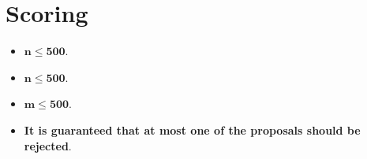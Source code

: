 \section*{Scoring}
\begin{itemize}
    \item $\mathbf{n} \mathbf{\leq} \mathbf{500}$.
    \item $\mathbf{n} \mathbf{\leq} \mathbf{500}$.
    \item $\mathbf{m} \mathbf{\leq} \mathbf{500}$.
    \item \textbf{It is guaranteed that at most one of the proposals should be
    rejected}.
\end{itemize}
